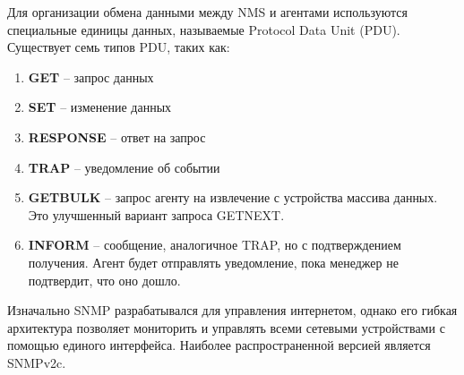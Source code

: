 Для организации обмена данными между NMS и агентами используются специальные единицы данных, называемые Protocol Data Unit (PDU)\cite{Alani2014}. Существует семь типов PDU, таких как:

\begin{enumerate}
    \item \textbf{GET} -- запрос данных
    \item \textbf{SET} -- изменение данных
    \item \textbf{RESPONSE} -- ответ на запрос
    \item \textbf{TRAP} -- уведомление об событии
    \item \textbf{GETBULK} -- запрос агенту на извлечение с устройства массива данных. Это улучшенный вариант запроса GETNEXT.
    \item \textbf{INFORM} -- сообщение, аналогичное TRAP, но с подтверждением получения. Агент будет отправлять уведомление, пока менеджер не подтвердит, что оно дошло.
\end{enumerate}

Изначально SNMP разрабатывался для управления интернетом, однако его гибкая архитектура позволяет мониторить и управлять
всеми сетевыми устройствами с помощью единого интерфейса. Наиболее распространенной версией является SNMPv2c.